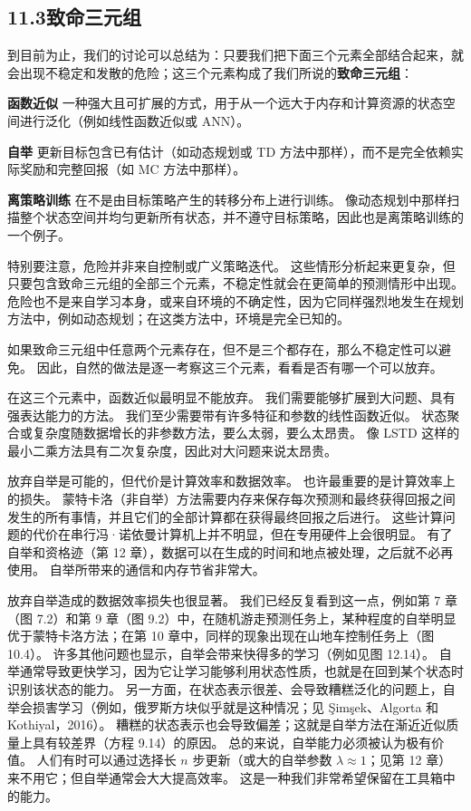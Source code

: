 \documentclass[UTF8,12pt,a4paper,fontset=fandol]{ctexart}
\begin{document}
\subsection*{11.3\quad 致命三元组}

到目前为止，我们的讨论可以总结为：只要我们把下面三个元素全部结合起来，就会出现不稳定和发散的危险；这三个元素构成了我们所说的\textbf{致命三元组}：

\noindent\textbf{函数近似}
一种强大且可扩展的方式，用于从一个远大于内存和计算资源的状态空间进行泛化（例如线性函数近似或 ANN）。

\noindent\textbf{自举}
更新目标包含已有估计（如动态规划或 TD 方法中那样），而不是完全依赖实际奖励和完整回报（如 MC 方法中那样）。

\noindent\textbf{离策略训练}
在不是由目标策略产生的转移分布上进行训练。
像动态规划中那样扫描整个状态空间并均匀更新所有状态，并不遵守目标策略，因此也是离策略训练的一个例子。

特别要注意，危险并非来自控制或广义策略迭代。
这些情形分析起来更复杂，但只要包含致命三元组的全部三个元素，不稳定性就会在更简单的预测情形中出现。
危险也不是来自学习本身，或来自环境的不确定性，因为它同样强烈地发生在规划方法中，例如动态规划；在这类方法中，环境是完全已知的。

如果致命三元组中任意两个元素存在，但不是三个都存在，那么不稳定性可以避免。
因此，自然的做法是逐一考察这三个元素，看看是否有哪一个可以放弃。

在这三个元素中，函数近似最明显不能放弃。
我们需要能够扩展到大问题、具有强表达能力的方法。
我们至少需要带有许多特征和参数的线性函数近似。
状态聚合或复杂度随数据增长的非参数方法，要么太弱，要么太昂贵。
像 LSTD 这样的最小二乘方法具有二次复杂度，因此对大问题来说太昂贵。

放弃自举是可能的，但代价是计算效率和数据效率。
也许最重要的是计算效率上的损失。
蒙特卡洛（非自举）方法需要内存来保存每次预测和最终获得回报之间发生的所有事情，并且它们的全部计算都在获得最终回报之后进行。
这些计算问题的代价在串行冯·诺依曼计算机上并不明显，但在专用硬件上会很明显。
有了自举和资格迹（第 12 章），数据可以在生成的时间和地点被处理，之后就不必再使用。
自举所带来的通信和内存节省非常大。

放弃自举造成的数据效率损失也很显著。
我们已经反复看到这一点，例如第 7 章（图 7.2）和第 9 章（图 9.2）中，在随机游走预测任务上，某种程度的自举明显优于蒙特卡洛方法；在第 10 章中，同样的现象出现在山地车控制任务上（图 10.4）。
许多其他问题也显示，自举会带来快得多的学习（例如见图 12.14）。
自举通常导致更快学习，因为它让学习能够利用状态性质，也就是在回到某个状态时识别该状态的能力。
另一方面，在状态表示很差、会导致糟糕泛化的问题上，自举会损害学习（例如，俄罗斯方块似乎就是这种情况；见 Şimşek、Algorta 和 Kothiyal，2016）。
糟糕的状态表示也会导致偏差；这就是自举方法在渐近近似质量上具有较差界（方程 9.14）的原因。
总的来说，自举能力必须被认为极有价值。
人们有时可以通过选择长 $n$ 步更新（或大的自举参数 $\lambda\approx1$；见第 12 章）来不用它；但自举通常会大大提高效率。
这是一种我们非常希望保留在工具箱中的能力。
\end{document}
